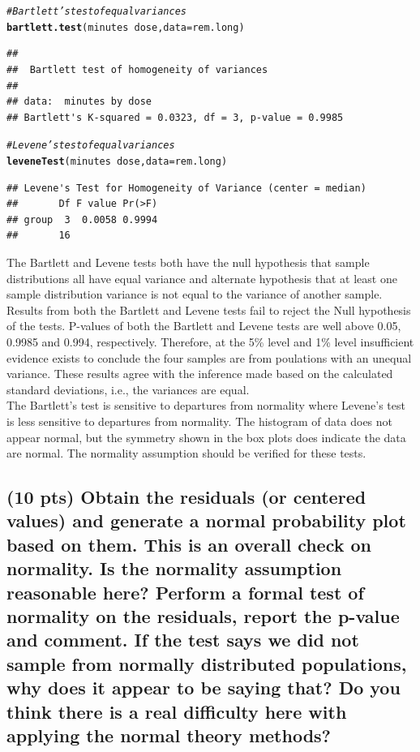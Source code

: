 \documentclass{article}\usepackage[]{graphicx}\usepackage[]{color}
\makeatletter
\newcommand{\hlcom}[1]{\textcolor[rgb]{0.678,0.584,0.686}{\textit{#1}}}%
\newcommand{\hlopt}[1]{\textcolor[rgb]{0,0,0}{#1}}%
\newcommand{\hlstd}[1]{\textcolor[rgb]{0.345,0.345,0.345}{#1}}%
\newcommand{\hlkwc}[1]{\textcolor[rgb]{0.333,0.667,0.333}{#1}}%
\newcommand{\hlkwd}[1]{\textcolor[rgb]{0.737,0.353,0.396}{\textbf{#1}}}%
\newenvironment{kframe}{%
 \def\at@end@of@kframe{}%
 \ifinner\ifhmode%
  \def\at@end@of@kframe{\end{minipage}}%
  \begin{minipage}{\columnwidth}%
 \fi\fi%
 \def\FrameCommand##1{\hskip\@totalleftmargin \hskip-\fboxsep
 \colorbox{shadecolor}{##1}\hskip-\fboxsep
     \hskip-\linewidth \hskip-\@totalleftmargin \hskip\columnwidth}%
 \MakeFramed {\advance\hsize-\width
   \@totalleftmargin\z@ \linewidth\hsize
   \@setminipage}}%
 {\par\unskip\endMakeFramed%
 \at@end@of@kframe}
\newenvironment{knitrout}{}{} %
\makeatother
\begin{document}
\begin{knitrout}
\color{fgcolor}\begin{kframe}
\begin{alltt}
\hlcom{#Bartlett's test of equal variances}
\hlkwd{bartlett.test}\hlstd{(minutes} \hlopt{~} \hlstd{dose,} \hlkwc{data} \hlstd{= rem.long)}
\end{alltt}
\begin{verbatim}
## 
## 	Bartlett test of homogeneity of variances
## 
## data:  minutes by dose
## Bartlett's K-squared = 0.0323, df = 3, p-value = 0.9985
\end{verbatim}
\begin{alltt}
\hlcom{#Levene's test of equal variances}
\hlkwd{leveneTest}\hlstd{(minutes} \hlopt{~} \hlstd{dose,} \hlkwc{data} \hlstd{= rem.long)}
\end{alltt}
\begin{verbatim}
## Levene's Test for Homogeneity of Variance (center = median)
##       Df F value Pr(>F)
## group  3  0.0058 0.9994
##       16
\end{verbatim}
\end{kframe}
\end{knitrout}
The Bartlett and Levene tests both have the null hypothesis that sample distributions all have equal variance and alternate hypothesis that at least one sample distribution variance is not equal to the variance of another sample.  Results from both the Bartlett and Levene tests fail to reject the Null hypothesis of the tests.  P-values of both the Bartlett and Levene tests are well above 0.05, 0.9985 and 0.994, respectively.  Therefore, at the 5\% level and 1\% level insufficient evidence exists to conclude the four samples are from poulations with an unequal variance.  These results agree with the inference made based on the calculated standard deviations, i.e., the variances are equal.\\

The Bartlett's test is sensitive to departures from normality where Levene's test is less sensitive to departures from normality.  The histogram of data does not appear normal, but the symmetry shown in the box plots does indicate the data are normal.  The normality assumption should be verified for these tests.

\subsection{(10 pts) Obtain the residuals (or centered values) and generate a normal probability plot based on them. This is an overall check on normality. Is the normality assumption reasonable here? Perform a formal test of normality on the residuals, report the p-value and comment. If the test says we did not sample from normally distributed populations, why does it appear to be saying that? Do you think there is a real difficulty here with applying the normal theory methods?}
\end{document}

